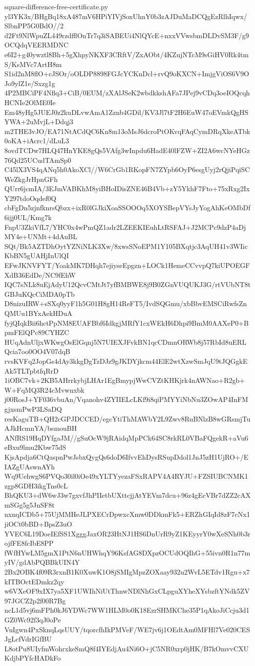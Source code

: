 \documentclass[11pt]{article}
\theoremstyle{definition}
\theoremstyle{remark}
\begin{document}
\begin{filecontents*}[overwrite]{square-difference-free-certificate.py}
yl3YK3x/BHgBq18xA487mV6HPiYIVjSoxUhnY0b3zAJDuMaDCQgEzRlhIqwx/SlbnPP5G0BdO//2
d2Ft9NlWpuZL449rzdfflOnTr7q3iSABEUi4NlQYcE+nxxVVwsbmDLDvSM3F/g9OCQdqVEERMDNC
e6I2+g40ywztl8Bh+5gXhpyNKXF3CRftV/ZxAObt/4KZujNTcM9sGiHV0Rk4tmS/KsMVc7ArtH8m
S1id2nM8flO+cJSOr/oOLDP8898FGJcYCKnDcl+rvQ9oKXCN+ImjgViOS6V9OJo9ylZ1e/Sxzg1g
4P2MBCiPF4Nflq3+CiB/0EUM/zXAlJSeK2wbdkkshAFa7JPej9vCDq3oeIOQcqhHCNIe2OlME0Ie
Em48yHg5JUEJ0z2kuDLvwAmA1Zznb4GDil/KV3Jl7tF2H6EuW47oEVmkQgHSYWA+2uMvjL+Ddqj3
m2THE3vJO/EA71NtACdQC6Kn8m13oMsJ6dcroPtOKvqFAqCymDRqXkeATbk0oKA+iAcrc1/dLuL3
8ovdTCDw7HLQ47HnYKE8gQs5VAfg3wInpdu6HadE40lFZW+ZI2A6wcNYeHGz76Qd25UCudTAmSp0
C45lX3VS4qANq5h0AkoXCl//W6CrGb1RKopFN7ZYpb6OyP6esgUyj2rQjiPqiSCWeZkgJrHpnGFh
QUrr6jcmIA/3EJmVABKhM8yiBHoIDisZNE46B4Vb+zY5YkhF7Fto+75xRxg2IxY297tdoOqdef0Q
cbFgDn5zjnfknrsQbzx+ixR0lGJkiXoaSSOOOq5XOYSBepVYsJyYogAhKeOMbDf6ijj0UL/Kmg7k
FnpU3ZkiVfL7/YHC0x4wPmQZ1adr2LZEEKIEuhLtRSFAJ+J2MCPc9dzP4aDjMY4e+UNMt+4dAuBL
SQt/Bk5AZTDhOytYZNiNLK3Xw/8xwsSNoEPM1Y105BXqtjc3AqUH41v3WIicKbBN5gUAHjInUlQI
EFwJKNVFYT/YoakMK7DHqh7ejiyseEpgzn+LOCk1HemeCCvvpQ7kiUPOEGFXdB36EdDe/NC9fEhW
IQC7sNLk8uEjAdyU12QcvCMtJt7yfBMBWE8j9B0ZGnVUQUKJ3G/rtVUbNT8tGBJuKQcCiMDA0pTb
D8nizuIRW+sSXq0yyF1h5G01H8gH14ReFT5/IvdSQGmu/xbBbvEMSCiRwfsZnQMUu1BYxAekHDuA
fyjQIqkBii6hctPpNM8EUAFBbf6IdkgjMRfY1cxWEkH6Dhpi9BmM0AAXeP0+BpmFElQPc89CYHZC
HUqAdnUljxWKwgOsElGqnj5N7UIEXJFvkBN1qcCDmnORWb8j57RbId8uERLQcia7oo0OO4V07dqB
rvsKVFq2JopGs4dAy3kkgDgTzDJz9gJKDYjkcm44ElE2wtXzwSmJqU9tJQGgkEAk5TLTpbtfqRrD
1iOBC7vk+2KB5AHrrkybjLHAr1EgBmypjWwCVZtKHKjrk4nAWNao+R2gb+W+FqMQ3R24cMvwnxbk
j00RosJ+YF036vbuAn/Vqanohv4ZYIIELcLKf9i8qiPMYYiNbNu3ZOwAP4InFMgjxsmPwP3LSaDQ
resKaguTB+QH2cGPJDCCED/egcYtiThMAWbY2L9Zwv8RuBNlzB8wGRsmjTuAJkHcmnYA/bsmouBH
ANfRS19HqDYfgaJM//gSuOcW9jRAidqMpPCk64SC8rkRL0VBaFQgekR+aVu6eBxu9lmu2Kbw75dS
KjsApdja6CtQaspnPwJsbxQygQs6doD6IfvvEhDysRSupDdol1JnJ5zH1UjRO+/EIAZgUAswnAYh
Wq9UehwgS6PVQo30il0iOe49xYLTYyezaFSxRAPV4A4RYJU+FZSIUBCNMK1zgp8GDH3ikgTns0cL
BhQKU3+dW6wJ3w7gxvfJhPIIetbUXttcjjAtYEVm7dcu+96z4gEcVBr7dZZ2cAXmSGg5g5JnSF8t
nxnqICDb5+75UjMMHeJLPXECrDpwxcXmw0DDkmFk5+ERZhGIqId8zF7cNx1jiOCt0bBD+BpsZ3uO
YVEC6L19DoeIEfSS1XgggJaxOR23HtNJ1HS6DnUrR9yZ1KEyyrY0wXeSNh0b3rojfFE8fcIbE8PP
fWfHYwLM5gmX1PtN6nUHWhqY96KsfAG8DXpzOCUdOQIhG+55ivn0R1n77myIV/gdAbPQBBkUIN4Y
2Bx2OBK4f09R3rxnB1K0XuwK1O8jSMIgMpzZOXaay932u2WvL5ETdv1Rgu+x7kITBOctEDmkz2qy
w6VXeOF9xIX7ya5XF1UWIhNiUtThnwNDlNhGxCLpguXYheXYsbzftYNdk5ZV97JGCZ2p2f00R7Bg
ncL1d5vj6mFPh0kJ6YDWc7WW1HLM0o0K18EzrSHMKChe35P1qAkoJiCcju3d1GZ0Wc92f3qJ0oPe
VuIgwn4PxSknqLqsUUY/tqorcfhIkPMVeF/WE7jv6j1OEdtAm0MFHl7Ve020CESJgLcfVdrIGfBU
L8otPu8UIyfmWohrxkeSmQ8f4IYEdjAu4Ni6O+jC5NR0xrp0jHK/B7kOmvvCXUKdjbPYfcHADkFo

\end{filecontents*}
\end{document}
